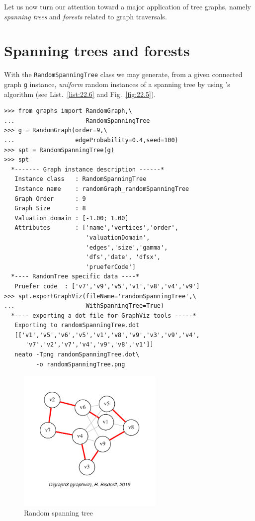 Let us now turn our attention toward a major application of tree graphs, namely \emph{spanning trees} and \emph{forests} related to graph traversals.

\section{Spanning trees and forests}
\label{sec:22.3}

With the \texttt{RandomSpanningTree} class we may generate, from a given connected graph \texttt{g} instance, \emph{uniform} random instances of a spanning tree by using \Wilson's algorithm (see List.~\vref{list:22.6} and Fig.~\vref{fig:22.5}).
\begin{lstlisting}[caption={Generating uniform random spanning trees.},label=list:22.6]
>>> from graphs import RandomGraph,\
...                    RandomSpanningTree
>>> g = RandomGraph(order=9,\
...                 edgeProbability=0.4,seed=100)
>>> spt = RandomSpanningTree(g)
>>> spt
  *------- Graph instance description ------*
   Instance class   : RandomSpanningTree
   Instance name    : randomGraph_randomSpanningTree
   Graph Order      : 9
   Graph Size       : 8
   Valuation domain : [-1.00; 1.00]
   Attributes       : ['name','vertices','order',
                       'valuationDomain',
                       'edges','size','gamma',
                       'dfs','date', 'dfsx',
                       'prueferCode']
  *---- RandomTree specific data ----*
   Pruefer code  : ['v7','v9','v5','v1','v8','v4','v9']
>>> spt.exportGraphViz(fileName='randomSpanningTree',\
...                    WithSpanningTree=True)
  *---- exporting a dot file for GraphViz tools -----*
   Exporting to randomSpanningTree.dot
   [['v1','v5','v6','v5','v1','v8','v9','v3','v9','v4',
      'v7','v2','v7','v4','v9','v8','v1']]
   neato -Tpng randomSpanningTree.dot\
         -o randomSpanningTree.png
\end{lstlisting}
\begin{figure}[ht]
\sidecaption[t]
\includegraphics[width=7cm]{Figures/22-5-randomSpanningTree.pdf}
\caption{Random spanning tree} 
\label{fig:22.5}       %
\end{figure}

